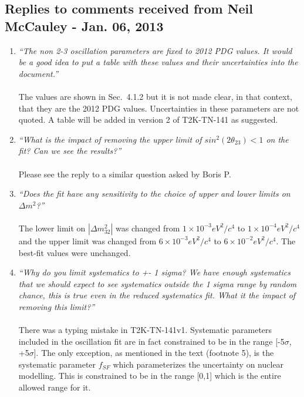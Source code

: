 \subsection{
  Replies to comments received from Neil McCauley - Jan. 06, 2013 }

\begin{enumerate}

\vspace{5 mm}
\item
{\em
  ``The non 2-3 oscillation parameters are fixed to 2012 PDG values. 
  It would be a good idea to put a table with these values and their uncertainties into the document.''
}\\
\\
The values are shown in Sec.\ 4.1.2 but it is not made clear, in that context, that they are 
the 2012 PDG values. Uncertainties in these parameters are not quoted.
A table will be added in version 2 of T2K-TN-141 as suggested.

\vspace{5 mm}
\item
{\em
  ``What is the impact of removing the upper limit of $sin^2(2\theta_{23})<1$ on the fit? Can we see the results?''
}\\
\\
Please see the reply to a similar question asked by Boris P.

\vspace{5 mm}
\item
{\em
  ``Does the fit have any sensitivity to the choice of upper and lower limits on ${\Delta}m^2$?''
}\\
\\
The lower limit on $|{\Delta}m^2_{32}|$ was changed from 
$1 \times 10^{-3} eV^2/c^4$ to $1 \times 10^{-4} eV^2/c^4$
and the upper limit was changed from 
$6 \times 10^{-3} eV^2/c^4$ to $6 \times 10^{-2} eV^2/c^4$.
The best-fit values were unchanged.

\vspace{5 mm}
\item
{\em
  ``Why do you limit systematics to +- 1 sigma? 
  We have enough systematics that we should expect to see systematics outside the 
  1 sigma range by random chance, this is true even in the reduced systematics fit. 
  What it the impact of removing this limit?''
}\\
\\
There was a typing mistake in T2K-TN-141v1.
Systematic parameters included in the oscillation fit are in fact constrained to be in the range
[-5$\sigma$, +5$\sigma$].  The only exception, as mentioned in the text (footnote 5), 
is the systematic parameter $f_{SF}$ which parameterizes the uncertainty on nuclear modelling. 
This is constrained to be in the 
range [0,1] which is the entire allowed range for it.


\end{enumerate}
